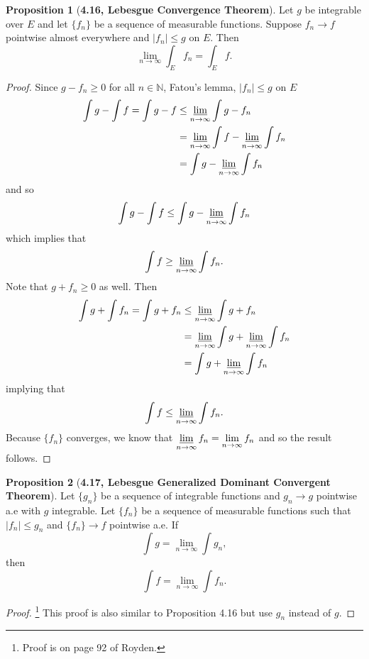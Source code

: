 \documentclass[12pt]{article}
\newcommand{\N}{\mathbb{N}}
\theoremstyle{definition}
\newtheorem*{prop}{Proposition}
\begin{document}
\begin{prop}[\textbf{4.16, Lebesgue Convergence Theorem}] Let \( g \) be integrable over \( E \) and let \( \{ f_n\} \) be a sequence of measurable functions. Suppose \( f_n \to f \) pointwise almost everywhere and \( |f_n| \leq g \) on \( E \). Then 
        \[
            \lim_{n \to \infty} \int_{E} f_n = \int_{E} f.  
        \]

    \begin{proof}
        Since \( g - f_n \geq 0 \) for all \(n \in \N \), Fatou's lemma, \( |f_n| \leq g \) on \( E \)
            \begin{align*}
                \int g - \int f = \int g - f &\leq \varliminf_{n \to \infty} \int g - f_n \\
                &= \varliminf_{n \to \infty} \int f - \varliminf_{n \to \infty} \int f_n \\
                &= \int g - \varliminf_{n \to \infty} \int f_n
            \end{align*}
        and so 
            \[
                \int g - \int f \leq  \int g - \varliminf_{n \to \infty} \int f_n
            \]
        which implies that
            \[
                \int f \geq \varliminf_{n \to \infty} \int f_n.
            \]
        Note that \( g + f_n \geq 0 \) as well. Then 
            \begin{align*}
                \int g + \int f_n = \int g + f_n &\leq \varliminf_{n \to \infty} \int g + f_n \\
                &= \varliminf_{n \to \infty} \int g + \varliminf_{n \to \infty} \int f_n \\
                &= \int g + \varliminf_{n \to \infty} \int f_n
            \end{align*}
        implying that
            \[
                \int f \leq \varliminf_{n \to \infty} \int f_n.  
            \]
        Because \( \{f_n\} \) converges, we know that \( \displaystyle \varliminf_{n \to \infty} f_n = \lim_{n \to \infty} f_n \) and so the result follows. 
    \end{proof}

\end{prop}

\begin{prop}[\textbf{4.17, Lebesgue Generalized Dominant Convergent Theorem}] 
    Let \( \{g_n\} \) be a sequence of integrable functions and \( g_n \to g \) pointwise a.e with \( g \) integrable. Let \( \{f_n\} \) be a sequence of measurable functions such that \( |f_n| \leq g_n \) and \( \{ f_n \} \to f \) pointwise a.e. If 
        \[
            \int g = \lim_{n \to \infty} \int g_n,  
        \]
    then 
        \[
            \int f = \lim_{n \to \infty} \int f_n.
        \]
    \begin{proof}\footnote{Proof is on page 92 of Royden.} This proof is also similar to Proposition 4.16 but use \( g_n \) instead of \( g \).
        
    \end{proof}
\end{prop}
\end{document}
